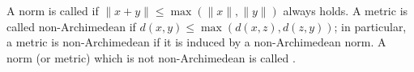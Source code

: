 A norm is called  if $\|x + y\| \leq \max(\|x\|, \|y\|)$ always holds. A metric is called non-Archimedean if $d(x, y) \leq \max(d(x, z), d(z, y))$; in particular, a metric is non-Archimedean if it is induced by a non-Archimedean norm. A norm (or metric) which is not non-Archimedean is called .
